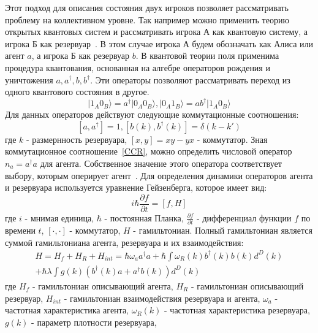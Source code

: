 Этот подход для описания состояния двух игроков позволяет рассматривать проблему на коллективном уровне.
Так например можно применить теорию открытых квантовых систем и рассматривать игрока А как квантовую
систему, а игрока Б как резервуар~\citep{bagarello2015operator,bagarello2015quantum}.
В этом случае игрока А будем обозначать как Алиса или агент $a$, а игрока Б как резервуар $b$.
В квантовой теории поля применима процедура квантования, основанная на алгебре операторов рождения
и уничтожения $a, a^{\dagger}, b, b^{\dagger}$.
Эти операторы позволяют рассматривать переход из одного квантового состояния в другое.
\begin{equation}
    \vert 1_{A} 0_{B} \rangle = a^{\dagger} \vert 0_{A} 0_{B} \rangle,
    \vert 0_{A} 1_{B} \rangle = a b^{\dagger} \vert 1_{A} 0_{B} \rangle
\end{equation}
Для данных операторов действуют следующие коммутационные соотношения:
\begin{equation}\label{CCR}
    [ a, a^{\dagger} ] = 1,
    [ b(k), b^{\dagger}(k) ] = \delta (k-k')
\end{equation}
где $k$ - размернность резервуара, $[x,y] = xy - yx$ - коммутатор.
Зная коммутационное соотношение~\eqref{CCR}, можно определить числовой оператор $n_a=a^{\dagger}a$
для агента.
Собственное значение этого оператора соответствует выбору, которым оперирует агент~\citep{bagarello2015quantum}.
Для определения динамики операторов агента и резервуара используется уравнение Гейзенберга, которое имеет вид:
\begin{equation}
    i \hbar \frac{\partial f}{\partial t} = [f, H]
\end{equation}
где $i$ - мнимая единица, $\hbar$ - постоянная Планка, $\frac{\partial f}{\partial t}$ - дифференциал
функции $f$ по времени $t$, $[\cdot, \cdot]$ - коммутатор, $H$ - гамильтониан.
Полный гамильтониан является суммой гамильтониана агента, резервуара и их взаимодействия:
\begin{multline}
    H = H_f + H_R + H_{int} = \hbar \omega_a a^{\dagger} a + \hbar \int \omega_{R}(k) b^{\dagger}(k) b(k) d^{D}(k) \\
    + \hbar \lambda \int g(k)(b^{\dagger}(k) a + a^{\dagger} b(k)) d^{D}(k)
\end{multline}
где $H_f$ - гамильтониан описывающий агента, $H_R$ - гамильтониан описывающий резервуар, $H_{int}$ -
гамильтониан взаимодействия резервуара и агента, $\omega_{a}$ - частотная характеристика агента,
$\omega_{R}(k)$ - частотная характеристика резервуара, $g(k)$ - параметр плотности резервуара,
